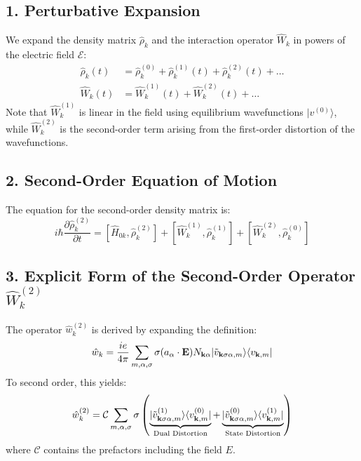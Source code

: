 \documentclass[aps,physrev,preprint,groupedaddress]{revtex4-2}
\newcommand{\kk}{{\bf k}}
\renewcommand{\[}{\left[}
\renewcommand{\]}{\right]}
\renewcommand{\(}{\left(}
\renewcommand{\)}{\right)}
\begin{document}
\subsection*{1. Perturbative Expansion}
We expand the density matrix $\hat{\rho}_k$ and the interaction operator $\hat{W}_k$ in powers of the electric field $\mathcal{E}$:
\begin{align}
    \hat{\rho}_k(t) &= \hat{\rho}_k^{(0)} + \hat{\rho}_k^{(1)}(t) + \hat{\rho}_k^{(2)}(t) + \dots \\
    \hat{W}_k(t) &= \hat{W}_k^{(1)}(t) + \hat{W}_k^{(2)}(t) + \dots
\end{align}
Note that $\hat{W}_k^{(1)}$ is linear in the field using equilibrium wavefunctions $|v^{(0)}\rangle$, while $\hat{W}_k^{(2)}$ is the second-order term arising from the first-order distortion of the wavefunctions.

\subsection*{2. Second-Order Equation of Motion}
The equation for the second-order density matrix is:
\begin{equation}
i\hbar \frac{\partial \hat{\rho}_k^{(2)}}{\partial t} = [\hat{H}_{0k}, \hat{\rho}_k^{(2)}] + [\hat{W}_k^{(1)}, \hat{\rho}_k^{(1)}] + [\hat{W}_k^{(2)}, \hat{\rho}_k^{(0)}]
\end{equation}

\subsection*{3. Explicit Form of the Second-Order Operator $\hat{W}_k^{(2)}$}
The operator $\hat{w}_k^{(2)}$ is derived by expanding the definition:
\begin{equation}
\hat{w}_k = \frac{ie}{4\pi} \sum_{m, \alpha, \sigma} \sigma (a_\alpha \cdot \mathbf E) N_{\kk \alpha} |\tilde{v}_{ \kk \sigma\alpha, m}\rangle \langle v_{\kk,m}|
\end{equation}
To second order, this yields:
\begin{equation}
\hat{w}_k^{(2)} = \mathcal{C} \sum_{m, \alpha, \sigma} \sigma \left( \underbrace{|\tilde{v}_{\kk\sigma\alpha, m}^{(1)}\rangle \langle v_{\kk,m}^{(0)}|}_{\text{Dual Distortion}} + \underbrace{|\tilde{v}_{\kk\sigma\alpha, m}^{(0)}\rangle \langle v_{\kk,m}^{(1)}|}_{\text{State Distortion}} \right)
\end{equation}
where $\mathcal{C}$ contains the prefactors including the field $E$.
\end{document}
